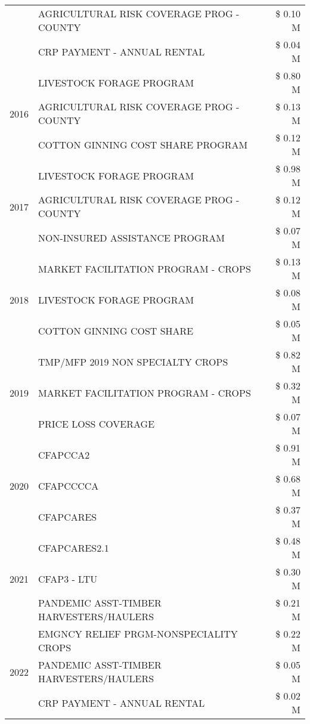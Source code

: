 \begin{tabular}{llr}
 & AGRICULTURAL RISK COVERAGE PROG - COUNTY & \$ 0.10 M \\
 & CRP PAYMENT - ANNUAL RENTAL & \$ 0.04 M \\
\cline{1-3}
\multirow[t]{3}{*}{2016} & LIVESTOCK FORAGE PROGRAM & \$ 0.80 M \\
 & AGRICULTURAL RISK COVERAGE PROG - COUNTY & \$ 0.13 M \\
 & COTTON GINNING COST SHARE PROGRAM & \$ 0.12 M \\
\cline{1-3}
\multirow[t]{3}{*}{2017} & LIVESTOCK FORAGE PROGRAM & \$ 0.98 M \\
 & AGRICULTURAL RISK COVERAGE PROG - COUNTY & \$ 0.12 M \\
 & NON-INSURED ASSISTANCE PROGRAM & \$ 0.07 M \\
\cline{1-3}
\multirow[t]{3}{*}{2018} & MARKET FACILITATION PROGRAM - CROPS & \$ 0.13 M \\
 & LIVESTOCK FORAGE PROGRAM & \$ 0.08 M \\
 & COTTON GINNING COST SHARE & \$ 0.05 M \\
\cline{1-3}
\multirow[t]{3}{*}{2019} & TMP/MFP 2019 NON SPECIALTY CROPS & \$ 0.82 M \\
 & MARKET FACILITATION PROGRAM - CROPS & \$ 0.32 M \\
 & PRICE LOSS COVERAGE & \$ 0.07 M \\
\cline{1-3}
\multirow[t]{3}{*}{2020} & CFAPCCA2 & \$ 0.91 M \\
 & CFAPCCCCA & \$ 0.68 M \\
 & CFAPCARES & \$ 0.37 M \\
\cline{1-3}
\multirow[t]{3}{*}{2021} & CFAPCARES2.1 & \$ 0.48 M \\
 & CFAP3 - LTU & \$ 0.30 M \\
 & PANDEMIC ASST-TIMBER HARVESTERS/HAULERS & \$ 0.21 M \\
\cline{1-3}
\multirow[t]{3}{*}{2022} & EMGNCY RELIEF PRGM-NONSPECIALITY CROPS & \$ 0.22 M \\
 & PANDEMIC ASST-TIMBER HARVESTERS/HAULERS & \$ 0.05 M \\
 & CRP PAYMENT - ANNUAL RENTAL & \$ 0.02 M \\
\cline{1-3}
\bottomrule
\end{tabular}
